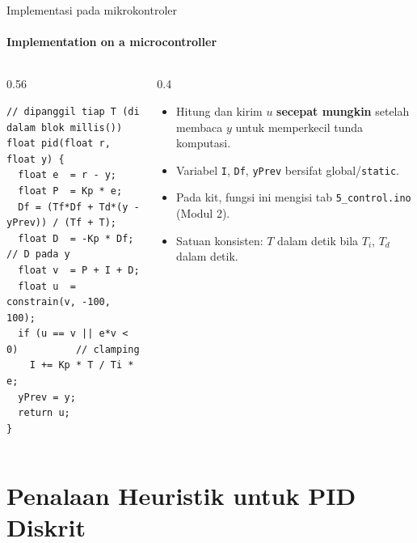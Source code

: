 \documentclass[aspectratio=169,10pt]{beamer}
\begin{document}
\begin{frame}[fragile]{Implementasi pada mikrokontroler}
	\framesubtitle{Implementation on a microcontroller}
	\begin{columns}[T]
		\begin{column}{0.56\textwidth}
			\begin{block}{}
				\scriptsize
\begin{verbatim}
// dipanggil tiap T (di dalam blok millis())
float pid(float r, float y) {
  float e  = r - y;
  float P  = Kp * e;
  Df = (Tf*Df + Td*(y - yPrev)) / (Tf + T);
  float D  = -Kp * Df;            // D pada y
  float v  = P + I + D;
  float u  = constrain(v, -100, 100);
  if (u == v || e*v < 0)          // clamping
    I += Kp * T / Ti * e;
  yPrev = y;
  return u;
}
\end{verbatim}
			\end{block}
		\end{column}
		\begin{column}{0.4\textwidth}
			\small
			\begin{itemize}
				\item Hitung dan kirim $u$ \textbf{secepat mungkin} setelah membaca $y$ untuk memperkecil tunda komputasi.
				\item Variabel \texttt{I}, \texttt{Df}, \texttt{yPrev} bersifat global/\texttt{static}.
				\item Pada kit, fungsi ini mengisi tab \texttt{5\_control.ino} (Modul 2).
				\item Satuan konsisten: $T$ dalam detik bila $T_i$, $T_d$ dalam detik.
			\end{itemize}
		\end{column}
	\end{columns}
\end{frame}

\section{Penalaan Heuristik untuk PID Diskrit\texorpdfstring{\\[4pt]{\Large{}}}{ / Heuristic Tuning of Discrete PID}}
\end{document}
